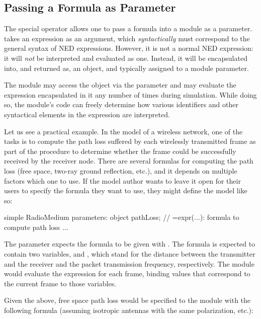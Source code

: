 \subsection{Passing a Formula as Parameter}
\label{sec:ned-lang:expr-operator}

The special operator  allows one to pass a formula into a
module as a parameter.  takes an expression as an argument,
which \textit{syntactically} must correspond to the general syntax of NED
expressions. However, it is not a normal NED expression: it will \textit{not} be
interpreted and evaluated as one. Instead, it will be encapsulated into, and
returned as, an object, and typically assigned to a module parameter.

The module may access the object via the parameter and may evaluate the
expression encapsulated in it any number of times during simulation. While doing
so, the module's code can freely determine how various identifiers and other
syntactical elements in the expression are interpreted.

Let us see a practical example. In the model of a wireless network, one of the
tasks is to compute the path loss suffered by each wirelessly transmitted frame
as part of the procedure to determine whether the frame could be successfully
received by the receiver node. There are several formulas for computing the path
loss (free space, two-ray ground reflection, etc.), and it depends on multiple
factors which one to use. If the model author wants to leave it open for their
users to specify the formula they want to use, they might define the model like
so:

\begin{ned}
simple RadioMedium {
    parameters:
        object pathLoss; // =expr(...): formula to compute path loss
    ...
}
\end{ned}

The  parameter expects the formula to be given with
. The formula is expected to contain two variables,
 and , which stand for the distance between the
transmitter and the receiver and the packet transmission frequency,
respectively. The module would evaluate the expression for each frame, binding
values that correspond to the current frame to those variables.

Given the above, free space path loss would be specified to the module with the
following formula (assuming isotropic antennas with the same polarization,
etc.):

